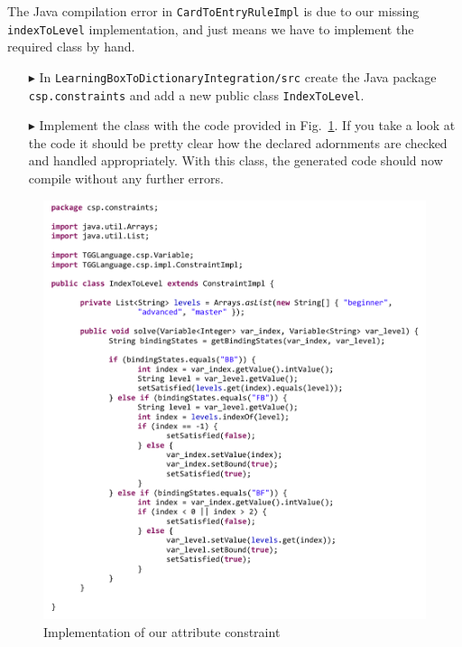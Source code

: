 The Java compilation error in \texttt{Card\-To\-Entry\-Rule\-Impl} is due to our missing \texttt{indexToLevel} implementation, and just means we have to implement the required class by hand.

\begin{enumerate}
\item[$\blacktriangleright$] In \texttt{LearningBox\-To\-Dictionary\-Integration/src} create the Java package \texttt{csp.constraints} and add a new public class \texttt{IndexToLevel}.
\item[$\blacktriangleright$] Implement the class with the code provided in Fig.~\ref{fig:indexToLevel}.
If you take a look at the code it should be pretty clear how the declared adornments are checked and handled appropriately.
With this class, the generated code should now compile without any further errors.
\end{enumerate}

\begin{figure}[htbp]
\begin{center}
  \includegraphics[height=0.71\textheight]{pics/tggBilder/transformation/tgg23}
  \caption{Implementation of our attribute constraint}  
  \label{fig:indexToLevel}
\end{center}
\end{figure} 

